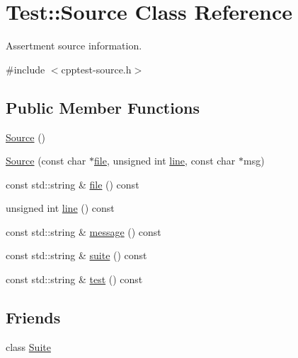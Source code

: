 \hypertarget{class_test_1_1_source}{}\section{Test\+:\+:Source Class Reference}
\label{class_test_1_1_source}


Assertment source information.  




{\ttfamily \#include $<$cpptest-\/source.\+h$>$}

\subsection*{Public Member Functions}
\begin{DoxyCompactItemize}
\item 
\mbox{\hyperlink{class_test_1_1_source_abe0f303fe92270aa12a4a749ae0395ef}{Source}} ()
\item 
\mbox{\hyperlink{class_test_1_1_source_ac764beb685a574b81527d0f90ae9e428}{Source}} (const char $\ast$\mbox{\hyperlink{class_test_1_1_source_a5244b21c0aae95eab1c87f69ab108a2d}{file}}, unsigned int \mbox{\hyperlink{class_test_1_1_source_ae3da8b65a4a950a4be76bae056dbb5ee}{line}}, const char $\ast$msg)
\item 
const std\+::string \& \mbox{\hyperlink{class_test_1_1_source_a5244b21c0aae95eab1c87f69ab108a2d}{file}} () const
\item 
unsigned int \mbox{\hyperlink{class_test_1_1_source_ae3da8b65a4a950a4be76bae056dbb5ee}{line}} () const
\item 
const std\+::string \& \mbox{\hyperlink{class_test_1_1_source_add142dd87973b9b16dfad92ba1efbe9c}{message}} () const
\item 
const std\+::string \& \mbox{\hyperlink{class_test_1_1_source_afb6c58ea7325e7082539f4e1cefc4508}{suite}} () const
\item 
const std\+::string \& \mbox{\hyperlink{class_test_1_1_source_a7f4861f56448910101a61d4e3c1c471f}{test}} () const
\end{DoxyCompactItemize}
\subsection*{Friends}
\begin{DoxyCompactItemize}
\item 
class \mbox{\hyperlink{class_test_1_1_source_a7de7b0dd89982bdae285f3a3b6197f9c}{Suite}}
\end{DoxyCompactItemize}


